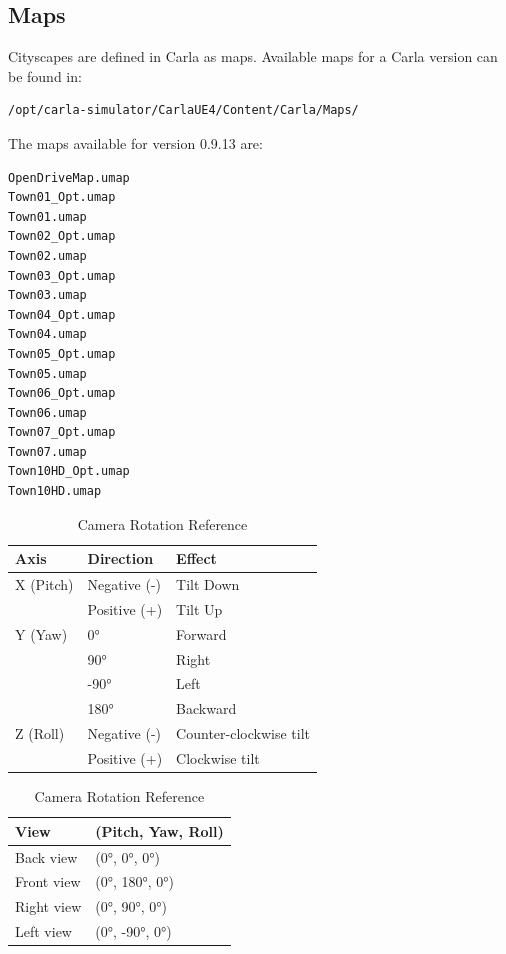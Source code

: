 \subsection{Maps}

Cityscapes are defined in Carla as maps. Available maps for a Carla version can be found in:
\begin{verbatim}
/opt/carla-simulator/CarlaUE4/Content/Carla/Maps/    
\end{verbatim}

The maps available for version 0.9.13 are:
\begin{verbatim}
OpenDriveMap.umap
Town01_Opt.umap
Town01.umap
Town02_Opt.umap
Town02.umap
Town03_Opt.umap
Town03.umap
Town04_Opt.umap
Town04.umap
Town05_Opt.umap
Town05.umap
Town06_Opt.umap
Town06.umap
Town07_Opt.umap
Town07.umap
Town10HD_Opt.umap
Town10HD.umap
\end{verbatim}

\begin{table}[h]
\centering
\begin{tabular}{lll}
\hline
\textbf{Axis} & \textbf{Direction} & \textbf{Effect} \\
\hline
X (Pitch) & Negative (-) & Tilt Down \\
          & Positive (+) & Tilt Up \\
\hline
Y (Yaw)   & 0°   & Forward \\
          & 90°  & Right \\
          & -90° & Left \\
          & 180° & Backward \\
\hline
Z (Roll)  & Negative (-) & Counter-clockwise tilt \\
          & Positive (+) & Clockwise tilt \\
\hline
\end{tabular}

\vspace{10pt}

\begin{tabular}{ll}
\hline
\textbf{View} & \textbf{(Pitch, Yaw, Roll)} \\
\hline
Back view  & (0°, 0°, 0°) \\
Front view & (0°, 180°, 0°) \\
Right view & (0°, 90°, 0°) \\
Left view  & (0°, -90°, 0°) \\
\hline
\end{tabular}
\caption{Camera Rotation Reference}
\label{cam_rotation_reference}
\end{table}

